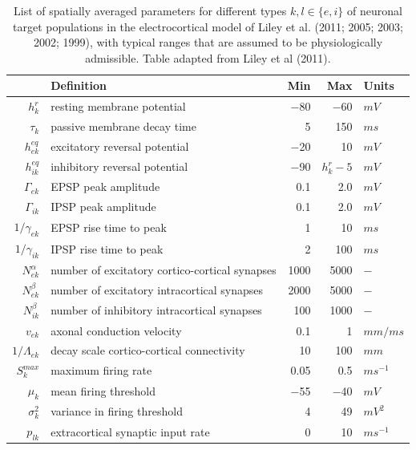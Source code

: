 \documentclass[a4paper,12pt]{article}
\begin{document}
\begin{table}[h]
\label{table:model_params} 
\begin{tabular}{r l r r l}
\hline 
 & Definition & Min & Max & Units \\
\hline
$h_k^r$ & resting membrane potential & −80 & −60 & $mV$ \\
$\tau_k$ & passive membrane decay time & 5 & 150 & $ms$ \\
$h_{ek}^{eq}$ & excitatory reversal potential & −20 & 10 & $mV$ \\
$h_{ik}^{eq}$ & inhibitory reversal potential & −90 & $h_k^r - 5$ & $mV$ \\
$\Gamma_{ek}$ & EPSP peak amplitude & 0.1 & 2.0 & $mV$ \\
$\Gamma_{ik}$ & IPSP peak amplitude & 0.1 & 2.0 & $mV$ \\
$1/\gamma_{ek}$ & EPSP rise time to peak & 1 & 10 & $ms$ \\
$1/\gamma_{ik}$ & IPSP rise time to peak & 2 & 100 & $ms$ \\
$N_{ek}^\alpha$ & number of excitatory cortico-cortical synapses & 1000 & 5000 & − \\
$N_{ek}^\beta$ & number of excitatory intracortical synapses & 2000 & 5000 & − \\
$N_{ik}^\beta$ & number of inhibitory intracortical synapses & 100 & 1000 & − \\
$v_{ek}$ & axonal conduction velocity & 0.1 & 1 & $mm/ms$ \\
$1 / \Lambda_{ek}$ & decay scale cortico-cortical connectivity & 10 & 100 & $mm$ \\
$S_k^{max}$ & maximum firing rate & 0.05 & 0.5 & $ms^{-1}$ \\
$\mu_k$ & mean firing threshold & −55 & −40 & $mV$ \\ 
$\sigma_k^2$ & variance in firing threshold & 4 & 49 & $mV^2$ \\
$p_{lk}$ & extracortical synaptic input rate & 0 & 10 & $ms^{-1}$ \\
\hline
\end{tabular}
\caption{List of spatially averaged parameters for different types $k,l \in \{e,
i\}$ of neuronal target populations in the electrocortical model of Liley et
al. (2011; 2005; 2003; 2002; 1999), with typical ranges that are
assumed to be physiologically admissible. Table adapted from Liley et
al (2011).}
\end{table}
\end{document}
